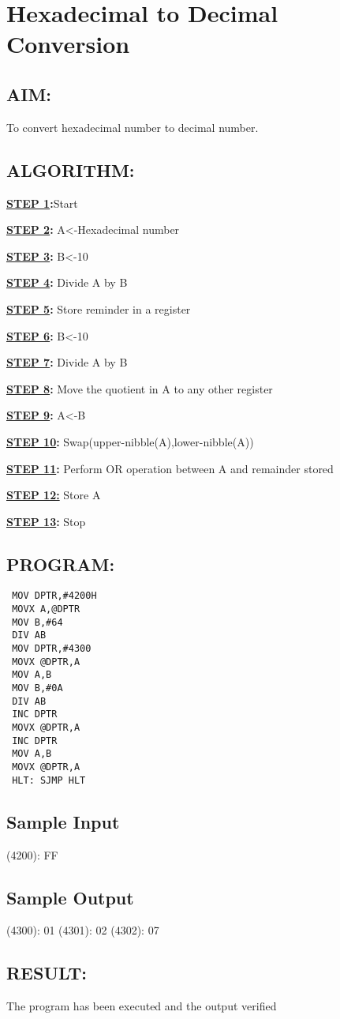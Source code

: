 \chapter{Hexadecimal to Decimal Conversion}
%
%
%
%
\section*{AIM:}
To convert hexadecimal number to decimal number.

\section*{ALGORITHM:}
\textbf{\underline{STEP 1}:}Start

\textbf{\underline{STEP 2}:} A<-Hexadecimal number

\textbf{\underline{STEP 3}:} B<-10

\textbf{\underline{STEP 4}:} Divide A by B

\textbf{\underline{STEP 5}:} Store reminder in a register

\textbf{\underline{STEP 6}:} B<-10

\textbf{\underline{STEP 7}:} Divide A by B

\textbf{\underline{STEP 8}:} Move the quotient in A to any other register

\textbf{\underline{STEP 9}:} A<-B

\textbf{\underline{STEP 10}:} Swap(upper-nibble(A),lower-nibble(A))

\textbf{\underline{STEP 11}:}  Perform OR operation between A and remainder stored

\textbf{\underline{STEP 12:}} Store A

\textbf{\underline{STEP 13}:} Stop


\section*{PROGRAM:}

\begin{lstlisting}
 MOV DPTR,#4200H 
 MOVX A,@DPTR 
 MOV B,#64 
 DIV AB 
 MOV DPTR,#4300 
 MOVX @DPTR,A 
 MOV A,B 
 MOV B,#0A 
 DIV AB 
 INC DPTR 
 MOVX @DPTR,A  
 INC DPTR 
 MOV A,B 
 MOVX @DPTR,A 
 HLT: SJMP HLT
\end{lstlisting}

\section*{Sample Input}
(4200): FF 

\section*{Sample Output}
(4300): 01 
(4301): 02 
(4302): 07 

\section*{RESULT:}
The program has been executed and the output verified
%
%
%
%
